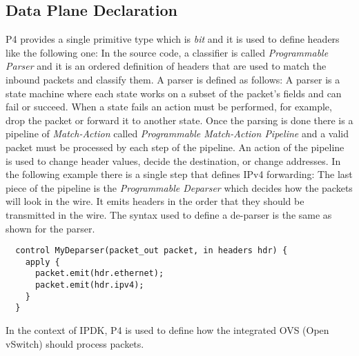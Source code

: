 \documentclass[../sn.tex]{subfiles}
\begin{document}
\subsection{Data Plane Declaration}
P4 provides a single primitive type which is \emph{bit} and it is used to define headers like the following one:
In the source code, a classifier is called \emph{Programmable Parser} and it is an ordered definition of headers that are used to match the inbound packets and classify them. A parser is defined as follows:
A parser is a state machine where each state works on a subset of the packet's fields and can fail or succeed. When a state fails an action must be performed, for example, drop the packet or forward it to another state.
Once the parsing is done there is a pipeline of \emph{Match-Action} called \emph{Programmable Match-Action Pipeline} and a valid packet must be processed by each step of the pipeline.
An action of the pipeline is used to change header values, decide the destination, or change addresses. In the following example there is a single step that defines IPv4 forwarding:
The last piece of the pipeline is the \emph{Programmable Deparser} which decides how the packets will look in the wire.
It emits headers in the order that they should be transmitted in the wire.
The syntax used to define a de-parser is the same as shown for the parser\cite{p4-docs}.
\begin{lstlisting}
  control MyDeparser(packet_out packet, in headers hdr) {
    apply {
      packet.emit(hdr.ethernet);
      packet.emit(hdr.ipv4);
    }
  }
\end{lstlisting}
In the context of IPDK, P4 is used to define how the integrated OVS (Open vSwitch) should process packets.
\end{document}
